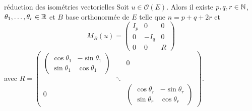 \begin{theoreme}{réduction des isométries vectorielles}{}
    Soit $u \in \mathcal O(E)$. Alors il existe $p, q, r \in \mathbb{N}$, 
    $\theta_1, \dots, \theta_r \in \mathbb{R}$ et $B$ base orthonormée de $E$ telle que $n = p + q + 2r$ et 
    $$M_B(u) = \begin{pmatrix}
        I_p & 0 & 0 \\
        0 & - I_q & 0 \\
        0 & 0 & R
    \end{pmatrix}$$
    avec $R = \begin{pmatrix}
        \begin{pmatrix} \cos \theta_1 & -\sin \theta_1 \\
        \sin \theta_1 & \cos \theta_1 \end{pmatrix}  & & 0\\
        & \ddots & \\
         0 & & \begin{pmatrix}
            \cos \theta_r & -\sin \theta_r \\
            \sin \theta_r & \cos \theta_r
        \end{pmatrix}
    \end{pmatrix}$.
\end{theoreme}



